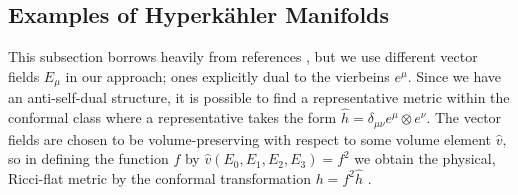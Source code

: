 \documentclass[a4paper,12pt, onecolumn, notitlepage]{article}
\theoremstyle{definition}
\theoremstyle{remark}
\newcommand{\m}{\mu}
\newcommand{\n}{\nu}
\begin{document}
\subsection{Examples of Hyperk\"ahler Manifolds}
This subsection borrows heavily from references \cite{ootsuka_1998,joyce_1995}, but we use different vector fields $E_{\m}$ in our approach; ones explicitly dual to the vierbeins $e^{\m}$. Since we have an anti-self-dual structure, it is possible to find a representative metric within the conformal class where a representative takes the form $\hat{h}=\delta_{\m\n}e^{\m}\otimes e^{\n}.$ The vector fields are chosen to be volume-preserving with respect to some volume element $\hat{v},$ so in defining the function $f$ by $\hat{v}(E_{0},E_{1},E_{2},E_{3}) = f^{2}$ we obtain the physical, Ricci-flat metric by the conformal transformation $h=f^{2}\hat{h}$ \cite{grant_1997}.\\
\end{document}
